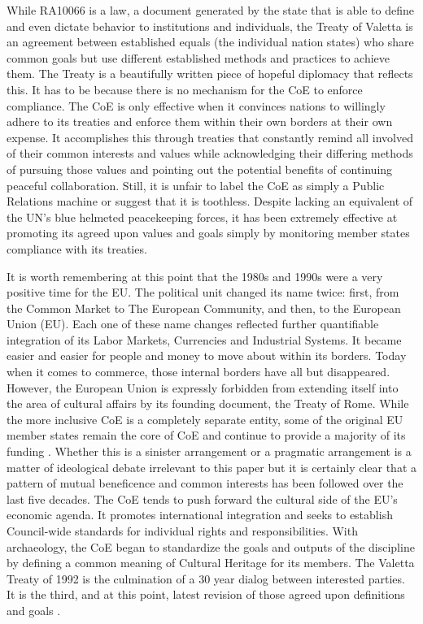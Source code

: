 While RA10066 is a law, a document generated by the state that is able to define and even dictate behavior to institutions and individuals, the Treaty of Valetta is an agreement between established equals (the individual nation states) who share common goals but use different established methods and practices to achieve them. The Treaty is a beautifully written piece of hopeful diplomacy that reflects this. It has to be because there is no mechanism for the CoE to enforce compliance. The CoE is only effective when it convinces nations to willingly adhere to its treaties and enforce them within their own borders at their own expense. It accomplishes this through treaties that constantly remind all involved of their common interests and values while acknowledging their differing methods of pursuing those values and pointing out the potential benefits of continuing peaceful collaboration. Still, it is unfair to label the CoE as simply a Public Relations machine or suggest that it is toothless. Despite lacking an equivalent of the UN’s blue helmeted peacekeeping forces, it has been extremely effective at promoting its agreed upon values and goals simply by monitoring member states compliance with its treaties.   

It is worth remembering at this point that the 1980s and 1990s were a very positive time for the EU. The political unit changed its name twice: first, from the Common Market to The European Community, and then, to the European Union (EU). Each one of these name changes reflected further quantifiable integration of its Labor Markets, Currencies and Industrial Systems. It became easier and easier for people and money to move about within its borders. Today when it comes to commerce, those internal borders have all but disappeared. However, the European Union is expressly forbidden from extending itself into the area of cultural affairs by its founding document, the Treaty of Rome. While the more inclusive CoE is a completely separate entity, some of the original EU member states remain the core of CoE and continue to provide a majority of its funding \parencite[74]{CoE_2000}. 
Whether this is a sinister arrangement or a pragmatic arrangement is a matter of ideological debate irrelevant to this paper but it is certainly clear that a pattern of mutual beneficence and common interests has been followed over the last five decades. The CoE tends to push forward the cultural side of the EU’s economic agenda. It promotes international integration and seeks to establish Council-wide standards for individual rights and responsibilities. With archaeology, the CoE began to standardize the goals and outputs of the discipline by defining a common meaning of Cultural Heritage for its members. The Valetta Treaty of 1992 is the culmination of a 30 year dialog between interested parties. It is the third, and at this point, latest revision of those agreed upon definitions and goals \parencite{Valetta_1992}. 

